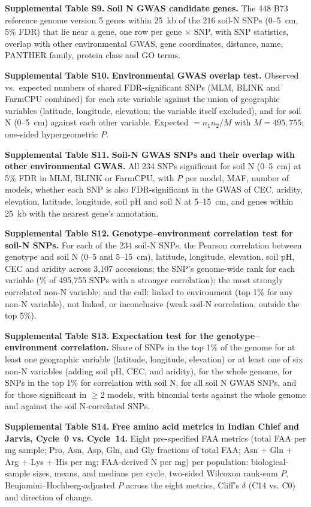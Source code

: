\documentclass[11pt]{article}
\begin{document}
\noindent\textbf{Supplemental Table S9.} \textbf{Soil N GWAS candidate genes.} The 448 B73 reference genome version 5 genes within 25~kb of the 216 soil-N SNPs (0--5~cm, 5\% FDR) that lie near a gene, one row per gene $\times$ SNP, with SNP statistics, overlap with other environmental GWAS, gene coordinates, distance, name, PANTHER family, protein class and GO terms.

\noindent\textbf{Supplemental Table S10.} \textbf{Environmental GWAS overlap test.} Observed vs.\ expected numbers of shared FDR-significant SNPs (MLM, BLINK and FarmCPU combined) for each site variable against the union of geographic variables (latitude, longitude, elevation; the variable itself excluded), and for soil N (0--5~cm) against each other variable. Expected $= n_1 n_2 / M$ with $M = 495{,}755$; one-sided hypergeometric $P$.

\noindent\textbf{Supplemental Table S11.} \textbf{Soil-N GWAS SNPs and their overlap with other environmental GWAS.} All 234 SNPs significant for soil N (0--5~cm) at 5\% FDR in MLM, BLINK or FarmCPU, with $P$ per model, MAF, number of models, whether each SNP is also FDR-significant in the GWAS of CEC, aridity, elevation, latitude, longitude, soil pH and soil N at 5--15~cm, and genes within 25~kb with the nearest gene's annotation.

\noindent\textbf{Supplemental Table S12.} \textbf{Genotype--environment correlation test for soil-N SNPs.} For each of the 234 soil-N SNPs, the Pearson correlation between genotype and soil N (0--5 and 5--15~cm), latitude, longitude, elevation, soil pH, CEC and aridity across 3,107 accessions; the SNP's genome-wide rank for each variable (\% of 495,755 SNPs with a stronger correlation); the most strongly correlated non-N variable; and the call: linked to environment (top 1\% for any non-N variable), not linked, or inconclusive (weak soil-N correlation, outside the top 5\%).

\noindent\textbf{Supplemental Table S13.} \textbf{Expectation test for the genotype–environment correlation.} Share of SNPs in the top 1\% of the genome for at least one geographic variable (latitude, longitude, elevation) or at least one of six non-N variables (adding soil pH, CEC, and aridity), for the whole genome, for SNPs in the top 1\% for correlation with soil N, for all soil N GWAS SNPs, and for those significant in $\geq$2 models, with binomial tests against the whole genome and against the soil N-correlated SNPs.

\noindent\textbf{Supplemental Table S14.} \textbf{Free amino acid metrics in Indian Chief and Jarvis, Cycle~0 vs. Cycle~14.} Eight pre-specified FAA metrics (total FAA per mg sample; Pro, Asn, Asp, Gln, and Gly fractions of total FAA; Asn + Gln + Arg + Lys + His per mg; FAA-derived N per mg) per population: biological-sample sizes, means, and medians per cycle, two-sided Wilcoxon rank-sum $P$, Benjamini--Hochberg-adjusted $P$ across the eight metrics, Cliff's $\delta$ (C14 vs. C0) and direction of change.
\end{document}
